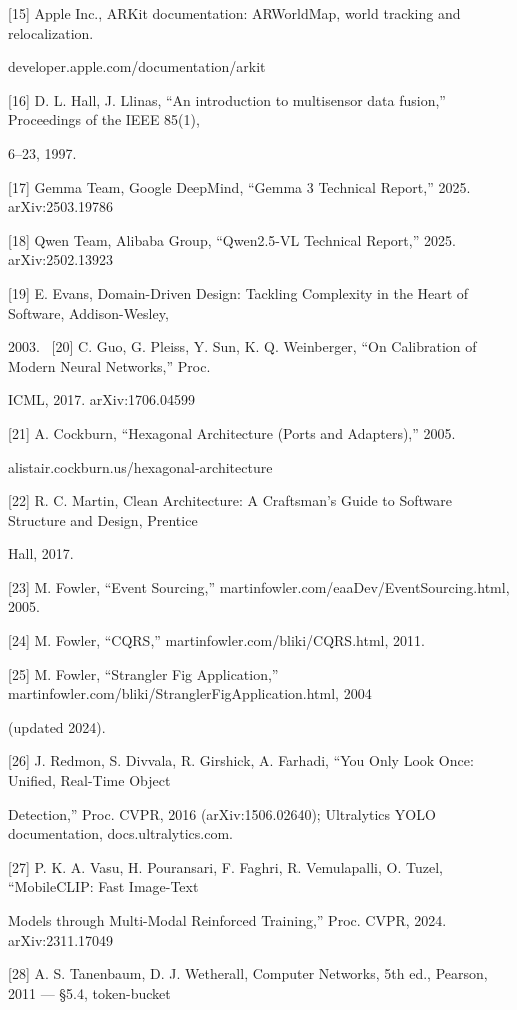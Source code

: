 {[}15{]} Apple Inc., ARKit documentation: ARWorldMap, world tracking and relocalization.

developer.apple.com/documentation/arkit

{[}16{]} D. L. Hall, J. Llinas, ``An introduction to multisensor data fusion,'' Proceedings of the IEEE 85(1),

6--23, 1997.

{[}17{]} Gemma Team, Google DeepMind, ``Gemma 3 Technical Report,'' 2025. arXiv:2503.19786

{[}18{]} Qwen Team, Alibaba Group, ``Qwen2.5-VL Technical Report,'' 2025. arXiv:2502.13923

{[}19{]} E. Evans, Domain-Driven Design: Tackling Complexity in the Heart of Software, Addison-Wesley,

2003.~
{[}20{]} C. Guo, G. Pleiss, Y. Sun, K. Q. Weinberger, ``On Calibration of Modern Neural Networks,'' Proc.

ICML, 2017. arXiv:1706.04599

{[}21{]} A. Cockburn, ``Hexagonal Architecture (Ports and Adapters),'' 2005.

alistair.cockburn.us/hexagonal-architecture

{[}22{]} R. C. Martin, Clean Architecture: A Craftsman's Guide to Software Structure and Design, Prentice

Hall, 2017.

{[}23{]} M. Fowler, ``Event Sourcing,'' martinfowler.com/eaaDev/EventSourcing.html, 2005.

{[}24{]} M. Fowler, ``CQRS,'' martinfowler.com/bliki/CQRS.html, 2011.

{[}25{]} M. Fowler, ``Strangler Fig Application,'' martinfowler.com/bliki/StranglerFigApplication.html, 2004

(updated 2024).

{[}26{]} J. Redmon, S. Divvala, R. Girshick, A. Farhadi, ``You Only Look Once: Unified, Real-Time Object

Detection,'' Proc. CVPR, 2016 (arXiv:1506.02640); Ultralytics YOLO documentation, docs.ultralytics.com.

{[}27{]} P. K. A. Vasu, H. Pouransari, F. Faghri, R. Vemulapalli, O. Tuzel, ``MobileCLIP: Fast Image-Text

Models through Multi-Modal Reinforced Training,'' Proc. CVPR, 2024. arXiv:2311.17049

{[}28{]} A. S. Tanenbaum, D. J. Wetherall, Computer Networks, 5th ed., Pearson, 2011 --- \S{}5.4, token-bucket

